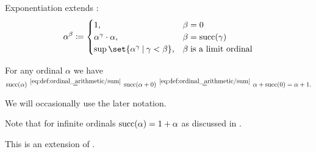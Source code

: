 \begin{definition}
\begin{thmenum}
     Exponentiation extends :
    \begin{equation}\label{eq:def:ordinal_arithmetic/exponentiation}
      \alpha^\beta \coloneqq \begin{cases}
        1,                                               &\beta = 0 \\
        \alpha^\gamma \cdot \alpha,                      &\beta = \op{succ}(\gamma) \\
        \sup\set{ \alpha^\gamma \given \gamma < \beta }, &\beta \T{is a limit ordinal} \\
      \end{cases}
    \end{equation}
  \end{thmenum}
\end{definition}

\begin{remark}\label{rem:ordinal_successor_via_addition}
  For any ordinal \( \alpha \) we have
  \begin{equation*}
    \op{succ}(\alpha)
    \reloset {\ref{eq:def:ordinal_arithmetic/sum}} =
    \op{succ}(\alpha + 0)
    \reloset {\ref{eq:def:ordinal_arithmetic/sum}} =
    \alpha + \op{succ}(0)
    =
    \alpha + 1.
  \end{equation*}

  We will occasionally use the later notation.

  Note that for infinite ordinals \( \operatorname{succ}(\alpha) = 1 + \alpha \) as discussed in .

  This is an extension of .
\end{remark}


